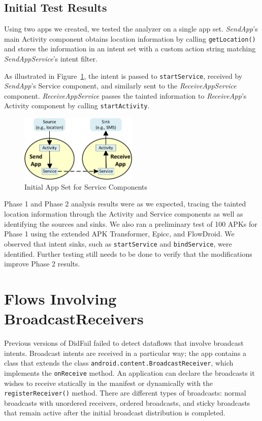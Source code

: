 \section{Initial Test Results}
Using two apps we created, we tested the analyzer on a single app set. \emph{SendApp}'s main Activity component obtains location information by calling \texttt{getLocation()} and stores the information in an intent set with a custom action string matching \emph{SendAppService}'s intent filter.

As illustrated in Figure~\ref{fig:servicetest1}, the intent is passed to \texttt{startService}, received by \emph{SendApp}'s Service component, and similarly sent to the \emph{ReceiveAppService} component. \emph{ReceiveAppService} passes the tainted information to \emph{ReceiveApp}'s Activity component by calling \texttt{startActivity}.

\begin{figure}[h]
	\centering
	\includegraphics[width=0.50\textwidth]{serviceapps_v2_crop.pdf}
	\caption{Initial App Set for Service Components}
	\label{fig:servicetest1}
\end{figure}

Phase 1 and Phase 2 analysis results were as we expected, tracing the tainted location information through the Activity and Service components as well as identifying the sources and sinks. We also ran a preliminary test of 100 APKs for Phase 1 using the extended APK Transformer, Epicc, and FlowDroid. We observed that intent sinks, such as \texttt{startService} and \texttt{bindService}, were identified. Further testing still needs to be done to verify that the modifications improve Phase 2 results.

\newpage
{}
\chapter{Flows Involving BroadcastReceivers} \label{chap:broadcast_receivers}
Previous versions of DidFail failed to detect dataflows that involve broadcast intents. Broadcast intents are received in a particular way; the app contains a class that extends the class \texttt{android.content.BroadcastReceiver}, which implements the \texttt{onReceive} method. An application can declare the broadcasts it wishes to receive statically in the manifest or dynamically with the \texttt{registerReceiver()} method. There are different types of broadcasts: normal broadcasts with unordered receivers, ordered broadcasts, and sticky broadcasts that remain active after the initial broadcast distribution is completed.


